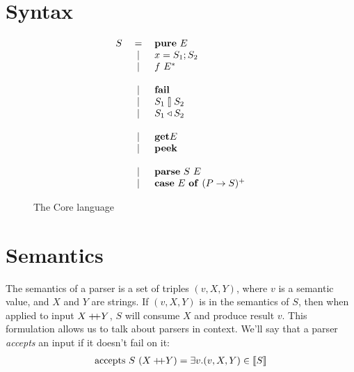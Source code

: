 \documentclass{article}
\begin{document}
\section{Syntax}

\begin{figure}[H]
{\setlength{\arraycolsep}{0pt}
\[
\begin{array}{rcl}
S &{}={}& \mathbf{pure}~{E} \\
  &{}|{}& {x} = {S_1}; {S_2} \\
  &{}|{}& {f}~{E^*} \\
\\
  &{}|{}& \mathbf{fail} \\
  &{}|{}& {S_1} \talloblong {S_2} \\
  &{}|{}& {S_1} \triangleleft {S_2} \\
\\
  &{}|{}& \mathbf{get}{E} \\
  &{}|{}& \mathbf{peek} \\
\\
  &{}|{}& \mathbf{parse}~{S}~{E} \\
  &{}|{}& \mathbf{case}~{E}~\mathbf{of}~{(P \to S)^+}
\end{array}
\]
}
\caption{The Core language}
\end{figure}


\section{Semantics}

The semantics of a parser is a set of triples $(v,X,Y)$, where
$v$ is a semantic value, and $X$ and $Y$ are strings.
If $(v,X,Y)$ is in the semantics of $S$, then when applied to
input $X +\!\!\!+ Y$, $S$ will consume $X$ and produce result $v$.
This formulation allows us to talk about parsers in context.  We'll
say that a parser {\em accepts} an input if it doesn't fail on it:
\begin{align*}
\mathrm{accepts}~ S~(X +\!\!\!+ Y) &= \exists v. (v,X,Y) \in \llbracket{S}\rrbracket \\
\end{align*}
\end{document}
